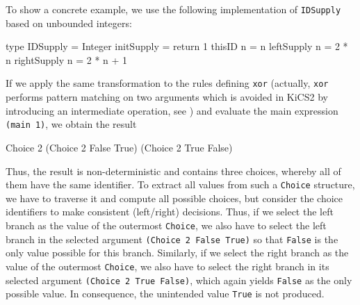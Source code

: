 \documentclass{llncs}
\newcommand{\code}[1]{\mbox{\small\texttt{#1}}}
\begin{document}
To show a concrete example, we use the following implementation
of \code{IDSupply} based on unbounded integers:
%
\begin{haskell}
  type IDSupply = Integer
  initSupply    = return 1
  thisID      n = n
  leftSupply  n = 2 * n
  rightSupply n = 2 * n + 1
\end{haskell}
%
If we apply the same transformation to the rules defining \code{xor}
(actually, \code{xor} performs pattern matching on two arguments
which is avoided in KiCS2 by introducing an intermediate operation,
see \cite{BrasselHanusPeemoellerReck11}) and evaluate the main expression
\code{(main 1)},
we obtain the result
\begin{haskell}
  Choice 2 (Choice 2 False True) (Choice 2 True False)
\end{haskell}
Thus, the result is non-deterministic and contains three choices,
whereby all of them have the same identifier.
To extract all values from such a \code{Choice} structure,
we have to traverse it and  compute all possible choices,
but consider the choice identifiers to make consistent (left/right)
decisions.
Thus, if we select the left branch as the value
of the outermost \code{Choice}, we also have to select the left branch
in the selected argument \code{(Choice 2 False True)} so that \code{False}
is the only value possible for this branch.
Similarly, if we select the right branch as the value of the outermost
\code{Choice}, we also have to select the right branch in
its selected argument \code{(Choice 2 True False)}, which again yields 
\code{False} as the only possible value. In consequence, 
the unintended value \code{True} is not produced.
\end{document}

